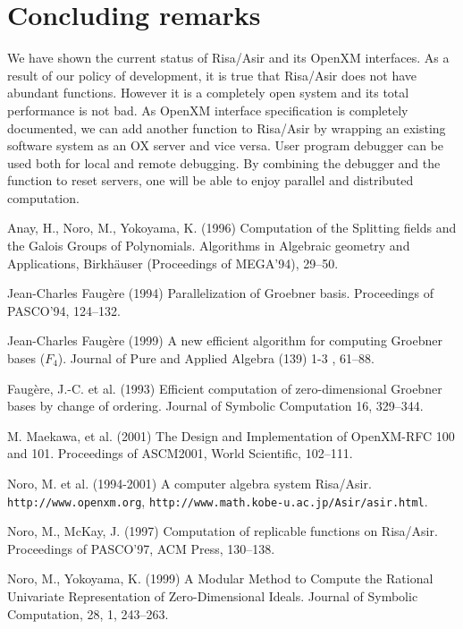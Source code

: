 \documentclass[runningheads]{cl2emult}
\begin{document}
\section{Concluding remarks}
We have shown the current status of Risa/Asir and its OpenXM
interfaces. As a result of our policy of development, it is true that
Risa/Asir does not have abundant functions. However it is a completely
open system and its total performance is not bad. As OpenXM interface
specification is completely documented, we can add another function to
Risa/Asir by wrapping an existing software system as an OX server and
vice versa. User program debugger can be used both for local and
remote debugging. By combining the debugger and the function to reset
servers, one will be able to enjoy parallel and distributed
computation.
%
\begin{thebibliography}{7}
%

Anay, H., Noro, M., Yokoyama, K. (1996)
Computation of the Splitting fields and the Galois Groups of Polynomials.
Algorithms in Algebraic geometry and Applications, 
Birkh\"auser (Proceedings of MEGA'94), 29--50.

Jean-Charles Faug\`ere (1994)
Parallelization of Groebner basis.
Proceedings of PASCO'94, 124--132.

Jean-Charles Faug\`ere (1999)
A new efficient algorithm for computing Groebner bases  ($F_4$).
Journal of Pure and Applied Algebra (139) 1-3 , 61--88.

Faug\`ere, J.-C. et al. (1993)
Efficient computation of zero-dimensional Groebner bases by change of ordering.
Journal of Symbolic Computation 16, 329--344.

M. Maekawa, et al. (2001)
The Design and Implementation of OpenXM-RFC 100 and 101.
Proceedings of ASCM2001, World Scientific, 102--111.

Noro, M. et al. (1994-2001)
A computer algebra system Risa/Asir.
{\tt http://www.openxm.org}, {\tt http://www.math.kobe-u.ac.jp/Asir/asir.html}.

Noro, M., McKay, J. (1997)
Computation of replicable functions on Risa/Asir.
Proceedings of PASCO'97, ACM Press, 130--138.

Noro, M., Yokoyama, K. (1999)
A Modular Method to Compute the Rational Univariate
Representation of Zero-Dimensional Ideals.
Journal of Symbolic Computation, 28, 1, 243--263.


\end{thebibliography}
\end{document}
